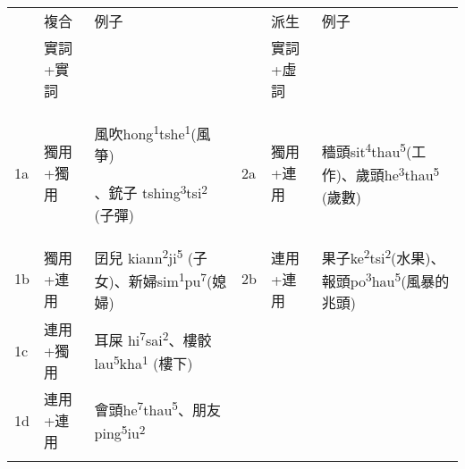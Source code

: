 \tabletail{}
\tablelasttail{}
\begin{tabularx}{\textwidth}{XXXXXX} & 複合 & 例子 &  & 派生 & 例子\\
\lsptoprule
& 實詞+實詞 &  &  & 實詞+虛詞 & \\
 1a & 獨用+獨用 & {\sffamily \textrm{風吹hong}\textrm{\textsuperscript{1}}\textrm{tshe}\textrm{\textsuperscript{1}}\textrm{(風箏)}}

{\sffamily \textrm{、銃子 tshing}\textrm{\textsuperscript{3}}\textrm{tsi}\textrm{\textsuperscript{2} }\textrm{(子彈)}} & 2a & 獨用+連用 & {\sffamily \textrm{穡頭sit}\textrm{\textsuperscript{4}}\textrm{thau}\textrm{\textsuperscript{5}}\textrm{(工作)、歲頭he}\textrm{\textsuperscript{3}}\textrm{thau}\textrm{\textsuperscript{5}} \textrm{(歲數)}}\\
 1b & 獨用+連用 & {\sffamily \textrm{囝兒 kiann}\textrm{\textsuperscript{2}}\textrm{ji}\textrm{\textsuperscript{5}} \textrm{(子女)、新婦sim}\textrm{\textsuperscript{1}}\textrm{pu}\textrm{\textsuperscript{7}}\textrm{(媳婦)}} & 2b & 連用+連用 & {\sffamily \textrm{果子ke}\textrm{\textsuperscript{2}}\textrm{tsi}\textrm{\textsuperscript{2}}\textrm{(水果)、報頭po}\textrm{\textsuperscript{3}}\textrm{hau}\textrm{\textsuperscript{5}}\textrm{(風暴的兆頭)}}\\
 1c & 連用+獨用 & {\sffamily \textrm{耳屎 hi}\textrm{\textsuperscript{7}}\textrm{sai}\textrm{\textsuperscript{2}}\textrm{、樓骹 lau}\textrm{\textsuperscript{5}}\textrm{kha}\textrm{\textsuperscript{1}} \textrm{(樓下)}} &  &  & \\
 1d & 連用+連用 & {\sffamily \textrm{會頭he}\textrm{\textsuperscript{7}}\textrm{thau}\textrm{\textsuperscript{5}}\textrm{、朋友ping}\textrm{\textsuperscript{5}}\textrm{iu}\textrm{\textsuperscript{2}}} &  &  & \\
\lspbottomrule
\end{tabularx}
